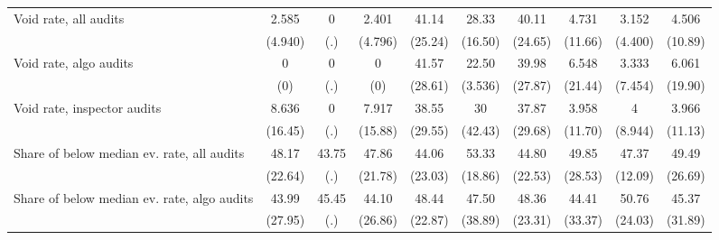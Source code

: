 {\begin{tabular}{l*{9}{c}}
Void rate, all audits&       2.585         &           0         &       2.401         &       41.14         &       28.33         &       40.11         &       4.731         &       3.152         &       4.506         \\
            &     (4.940)         &         (.)         &     (4.796)         &     (25.24)         &     (16.50)         &     (24.65)         &     (11.66)         &     (4.400)         &     (10.89)         \\
Void rate, algo audits&           0         &           0         &           0         &       41.57         &       22.50         &       39.98         &       6.548         &       3.333         &       6.061         \\
            &         (0)         &         (.)         &         (0)         &     (28.61)         &     (3.536)         &     (27.87)         &     (21.44)         &     (7.454)         &     (19.90)         \\
Void rate, inspector audits&       8.636         &           0         &       7.917         &       38.55         &          30         &       37.87         &       3.958         &           4         &       3.966         \\
            &     (16.45)         &         (.)         &     (15.88)         &     (29.55)         &     (42.43)         &     (29.68)         &     (11.70)         &     (8.944)         &     (11.13)         \\
Share of below median ev. rate, all audits&       48.17         &       43.75         &       47.86         &       44.06         &       53.33         &       44.80         &       49.85         &       47.37         &       49.49         \\
            &     (22.64)         &         (.)         &     (21.78)         &     (23.03)         &     (18.86)         &     (22.53)         &     (28.53)         &     (12.09)         &     (26.69)         \\
Share of below median ev. rate, algo audits&       43.99         &       45.45         &       44.10         &       48.44         &       47.50         &       48.36         &       44.41         &       50.76         &       45.37         \\
            &     (27.95)         &         (.)         &     (26.86)         &     (22.87)         &     (38.89)         &     (23.31)         &     (33.37)         &     (24.03)         &     (31.89)         \\

\end{tabular}}
